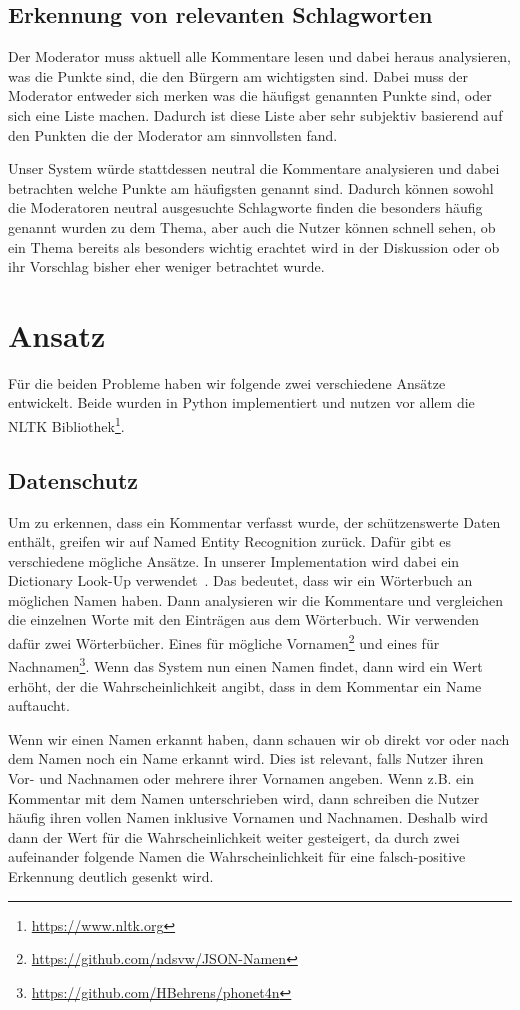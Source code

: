 \documentclass[runningheads]{llncs}
\begin{document}
	\subsection{Erkennung von relevanten Schlagworten}
		Der Moderator muss aktuell alle Kommentare lesen und dabei heraus analysieren, was die Punkte sind, die den Bürgern am wichtigsten sind.
		Dabei muss der Moderator entweder sich merken was die häufigst genannten Punkte sind, oder sich eine Liste machen.
		Dadurch ist diese Liste aber sehr subjektiv basierend auf den Punkten die der Moderator am sinnvollsten fand.
		
		Unser System würde stattdessen neutral die Kommentare analysieren und dabei betrachten welche Punkte am häufigsten genannt sind.
		Dadurch können sowohl die Moderatoren neutral ausgesuchte Schlagworte finden die besonders häufig genannt wurden zu dem Thema, aber auch die Nutzer können schnell sehen, ob ein Thema bereits als besonders wichtig erachtet wird in der Diskussion oder ob ihr Vorschlag bisher eher weniger betrachtet wurde.

\section{Ansatz}
	Für die beiden Probleme haben wir folgende zwei verschiedene Ansätze entwickelt.
	Beide wurden in Python implementiert und nutzen vor allem die NLTK Bibliothek\footnote{\url{https://www.nltk.org}}.
	
	\subsection{Datenschutz}
		Um zu erkennen, dass ein Kommentar verfasst wurde, der schützenswerte Daten enthält, greifen wir auf Named Entity Recognition zurück.
		Dafür gibt es verschiedene mögliche Ansätze.
		In unserer Implementation wird dabei ein Dictionary Look-Up verwendet~\cite{vajjala2020practical}.
		Das bedeutet, dass wir ein Wörterbuch an möglichen Namen haben.
		Dann analysieren wir die Kommentare und vergleichen die einzelnen Worte mit den Einträgen aus dem Wörterbuch.
		Wir verwenden dafür zwei Wörterbücher.
		Eines für mögliche Vornamen\footnote{\url{https://github.com/ndsvw/JSON-Namen}} und eines für Nachnamen\footnote{\url{https://github.com/HBehrens/phonet4n}}.
		Wenn das System nun einen Namen findet, dann wird ein Wert erhöht, der die Wahrscheinlichkeit angibt, dass in dem Kommentar ein Name auftaucht.
		
		Wenn wir einen Namen erkannt haben, dann schauen wir ob direkt vor oder nach dem Namen noch ein Name erkannt wird.
		Dies ist relevant, falls Nutzer ihren Vor- und Nachnamen oder mehrere ihrer Vornamen angeben. Wenn z.B. ein Kommentar mit dem Namen unterschrieben wird, dann schreiben die Nutzer häufig ihren vollen Namen inklusive Vornamen und Nachnamen.
		Deshalb wird dann der Wert für die Wahrscheinlichkeit weiter gesteigert, da durch zwei aufeinander folgende Namen die Wahrscheinlichkeit für eine falsch-positive Erkennung deutlich gesenkt wird.
		
\end{document}
